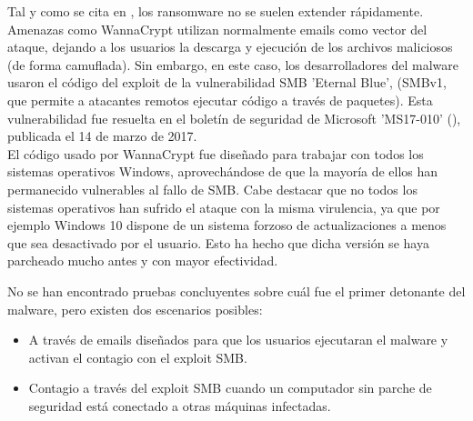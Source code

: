 Tal y como se cita en \cite{smb}, los ransomware no se suelen extender rápidamente. Amenazas como WannaCrypt utilizan normalmente emails como vector del ataque, dejando a los usuarios la descarga y ejecución de los archivos maliciosos (de forma camuflada). Sin embargo, en este caso, los desarrolladores del malware usaron el código del exploit de la vulnerabilidad SMB 'Eternal Blue', (SMBv1, que permite a atacantes remotos ejecutar código a través de paquetes). Esta vulnerabilidad fue resuelta en el boletín de seguridad de Microsoft 'MS17-010' (\cite{microsoft}), publicada el 14 de marzo de 2017. \\

El código usado por WannaCrypt fue diseñado para trabajar con todos los sistemas operativos Windows, aprovechándose de que la mayoría de ellos han permanecido vulnerables al fallo de SMB. Cabe destacar que no todos los sistemas operativos han sufrido el ataque con la misma virulencia, ya que por ejemplo Windows 10 dispone de un sistema forzoso de actualizaciones a menos que sea desactivado por el usuario. Esto ha hecho que dicha versión se haya parcheado mucho antes y con mayor efectividad.


No se han encontrado pruebas concluyentes sobre cuál fue el primer detonante del malware, pero existen dos escenarios posibles: \\
\begin{itemize}
	\item A través de emails diseñados para que los usuarios ejecutaran el malware y activan el contagio con el exploit SMB.
	\item Contagio a través del exploit SMB cuando un computador sin parche de seguridad está conectado a otras máquinas infectadas.
\end{itemize}